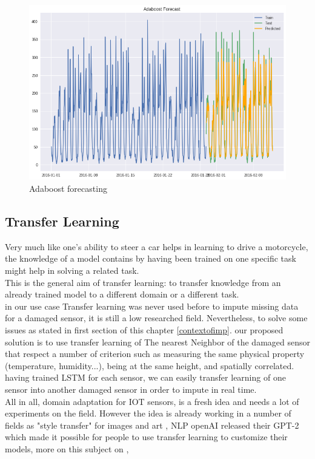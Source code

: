 \begin{figure}[!h]
\centering
\includegraphics[scale=.6]{img/adaboost_results.png}  
\caption{Adaboost forecasting}
\label{fig:adaboost}
\end{figure}


\subsection{Transfer Learning}
Very much like one's ability to steer a car helps in learning to drive a motorcycle, the knowledge of a model contains by having been trained on one specific task might help in solving a related task.\\This is the general aim of transfer learning: to transfer knowledge from an already trained model to a different domain or a different task.\\ in our use case Transfer learning was never used before to impute missing data for a damaged sensor, it is still a low researched field. Nevertheless, to solve some issues as stated in first section of this chapter \ref{contextofimp}. our proposed solution is to use transfer learning of The nearest Neighbor of the damaged sensor that respect a number of  criterion  such as measuring the same physical property (temperature, humidity...),
being at the same height, and spatially correlated.
having trained LSTM for each sensor, we can easily transfer learning of one sensor into another damaged sensor in order to impute in real time.\\ All in all, domain adaptation for IOT sensors, is a fresh idea and needs a lot of experiments on the field. However the idea is already working in a number of fields as "style transfer" for images and art \cite{transferlearning}, NLP openAI released their GPT-2 which made it possible for people to use transfer learning to customize their models, more on this subject on \cite{nlp},   



